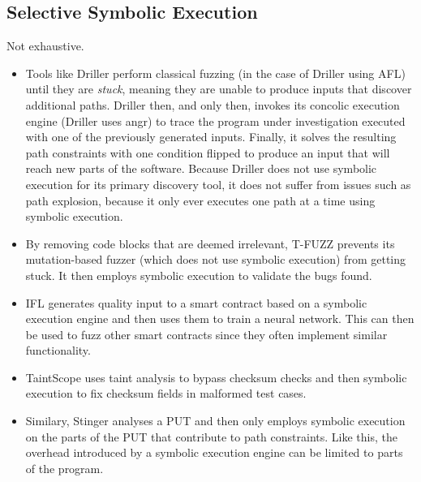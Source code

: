 \documentclass{article}
\begin{document}
\begin{multicols}{2}
    \subsection{Selective Symbolic Execution}
    Not exhaustive.
    \begin{itemize}
        \item Tools like Driller\cite{Driller} perform classical fuzzing (in the case of Driller using AFL\cite{AFLPlusPlus}) until they are \textit{stuck}, meaning they are unable to produce inputs that discover additional paths. Driller then, and only then, invokes its concolic execution engine (Driller uses angr\cite{angr}) to trace the program under investigation executed with one of the previously generated inputs. Finally, it solves the resulting path constraints with one condition flipped to produce an input that will reach new parts of the software. Because Driller does not use symbolic execution for its primary discovery tool, it does not suffer from issues such as path explosion, because it only ever executes one path at a time using symbolic execution.
        \item By removing code blocks that are deemed irrelevant, T-FUZZ\cite{TFuzz} prevents its mutation-based fuzzer (which does not use symbolic execution) from getting stuck. It then employs symbolic execution to validate the bugs found.
        \item IFL\cite{IFL} generates quality input to a smart contract based on a symbolic execution engine and then uses them to train a neural network. This can then be used to fuzz other smart contracts since they often implement similar functionality.
        \item TaintScope\cite{TaintScope} uses taint analysis to bypass checksum checks and then symbolic execution to fix checksum fields in malformed test cases.
        \item Similary, Stinger\cite{Stinger} analyses a PUT and then only employs symbolic execution on the parts of the PUT that contribute to path constraints. Like this, the overhead introduced by a symbolic execution engine can be limited to parts of the program.
    \end{itemize}


\end{multicols}
\end{document}
